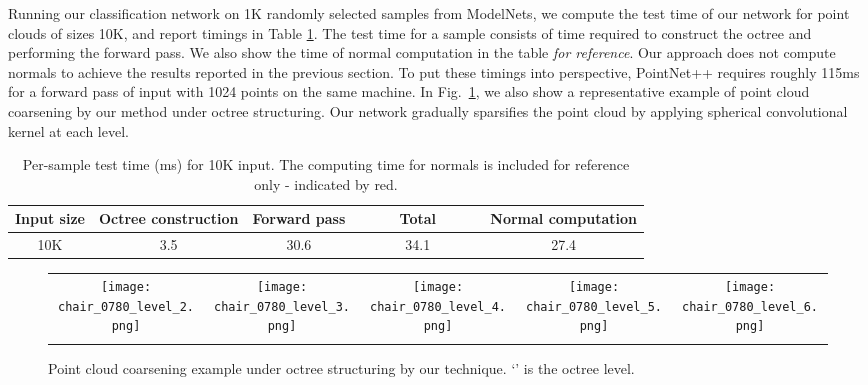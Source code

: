 \documentclass[10pt,twocolumn,letterpaper]{article}
\begin{document}
{Running our classification network on 1K randomly selected samples from ModelNets, we compute the test time of our network for point clouds of sizes 10K, and report timings in Table \ref{tab:test_time}. 
The test time for a sample consists of time required to construct the octree and performing the forward pass. We also show the time of normal computation in the table \textit{for reference}.  Our approach does not compute normals to achieve the results reported in the previous section. To put these timings into perspective,  PointNet++ \cite{qi2017pointnetplusplus} requires roughly 115ms for a forward pass of input with 1024 points on the same machine. In Fig.~\ref{fig:octree_coarsen}, we also show a representative example of point cloud coarsening by our method under octree structuring. Our network gradually sparsifies the point cloud by applying spherical convolutional kernel at each level. \begin{table}
\centering
\begin{adjustbox}{width=0.47\textwidth}
{\LARGE\begin{tabular}{c|c|c|c||c}
  \hline  
 Input size & Octree construction & Forward pass&~~~~~Total~~~~~& \cellcolor{red!15} Normal computation \\
  \hline
  \hline
  10K & 3.5 & 30.6 & 34.1& \cellcolor{red!7}27.4\\
  \hline
\end{tabular}}
\end{adjustbox}
\caption{Per-sample test time (ms) for 10K input. The computing time for normals is included for reference only - indicated by red.}
\label{tab:test_time}
\vspace{-2mm}
\end{table}
\begin{figure}
    \centering
    \begin{tabular}{ccccc}
         \texttt{[image: chair\_0780\_level\_2.png]}&  
         \texttt{[image: chair\_0780\_level\_3.png]}& 
         \texttt{[image: chair\_0780\_level\_4.png]}& 
         \texttt{[image: chair\_0780\_level\_5.png]}& 
         \texttt{[image: chair\_0780\_level\_6.png]}\\
          &  &  & &  \\
    \end{tabular}
    \caption{Point cloud coarsening example under octree structuring by our technique. `' is the octree level.}
    \label{fig:octree_coarsen}
    \vspace{-5mm}
\end{figure}
}
\end{document}

